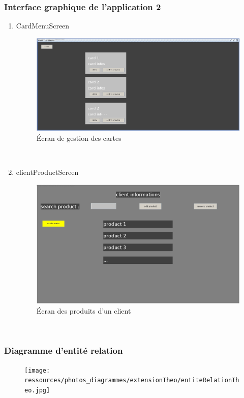 \documentclass[../rapport.tex]{subfiles}
\begin{document}
\subsubsection{Interface graphique de l'application 2}
\begin{enumerate}
	\item{CardMenuScreen}\\
	\begin{figure}[h!]
		\centering\includegraphics[scale=0.15]{ressources/photos_diagrammes/extensionTheo/gui2/cardMenu.jpg}
		\caption{Écran de gestion des cartes}
	\end{figure}\\

\item{clientProductScreen}\\
	\begin{figure}[h!]
		\centering\includegraphics[scale=0.15]{ressources/photos_diagrammes/extensionTheo/gui2/clientProductMenu.jpg}
		\caption{Écran des produits d'un client}
	\end{figure}\\

\end{enumerate}

\subsubsection{Diagramme d'entité relation}
	\begin{figure}[h!]
		\centering\texttt{[image: ressources/photos\_diagrammes/extensionTheo/entiteRelationTheo.jpg]}
	\end{figure}\\

\newpage
\end{document}
